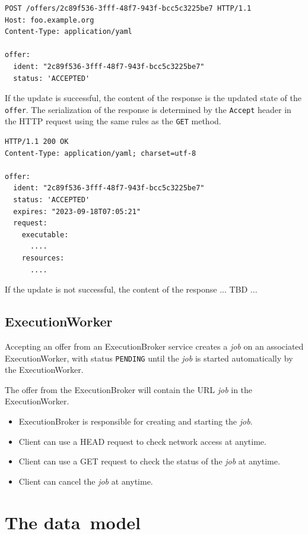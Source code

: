 \documentclass[11pt,a4paper]{ivoa}
\newcommand{\datamodel} {data~model}
\newcommand{\execbrokerclass} {ExecutionBroker}
\newcommand{\execworkerclass} {ExecutionWorker}
\newcommand{\codeword}[1] {\texttt{#1}}
\newcommand{\job} {\textit{job}}
\begin{document}
\begin{lstlisting}[]
POST /offers/2c89f536-3fff-48f7-943f-bcc5c3225be7 HTTP/1.1
Host: foo.example.org
Content-Type: application/yaml

offer:
  ident: "2c89f536-3fff-48f7-943f-bcc5c3225be7"
  status: 'ACCEPTED'
\end{lstlisting}

If the update is successful, the content of the response is the updated state of the \codeword{offer}.
The serialization of the response is determined by the \codeword{Accept} header in the HTTP request
using the same rules as the \codeword{GET} method.

\begin{lstlisting}[]
HTTP/1.1 200 OK
Content-Type: application/yaml; charset=utf-8

offer:
  ident: "2c89f536-3fff-48f7-943f-bcc5c3225be7"
  status: 'ACCEPTED'
  expires: "2023-09-18T07:05:21"
  request:
    executable:
      ....
    resources:
      ....
\end{lstlisting}

If the update is not successful, the content of the response ... TBD ...


\subsection{ExecutionWorker}
\label{execution-worker-spec}

Accepting an offer from an \execbrokerclass{} service creates a \job{} on an associated \execworkerclass{},
with status \codeword{PENDING} until the \job{} is started automatically by the \execworkerclass{}.

The offer from the \execbrokerclass{} will contain the URL \job{} in the \execworkerclass{}.

\begin{itemize}
    \item \execbrokerclass{} is responsible for creating and starting the \job{}.
    \item Client can use a HEAD request to check network access at anytime.
    \item Client can use a GET request to check the status of the \job{} at anytime.
    \item Client can cancel the \job{} at anytime.
\end{itemize}

\pagebreak

\section{The \datamodel{}}
\label{datamodel}
\end{document}
